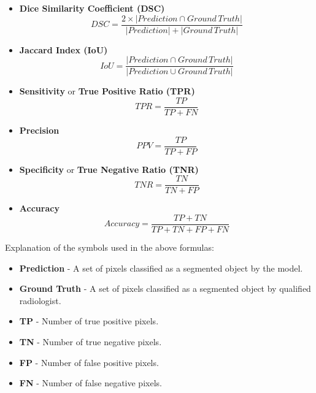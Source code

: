 \begin{itemize}
    \item \textbf{Dice Similarity Coefficient (DSC)} \begin{equation}
    DSC = \frac{2 \times |Prediction \cap Ground\,Truth|}{|Prediction| + |Ground\,Truth|} 
\end{equation}

    \item \textbf{Jaccard Index (IoU)}
    \begin{equation}
     IoU = \frac{|Prediction \cap Ground\,Truth|}{|Prediction \cup Ground\,Truth|} \end{equation}

     \item \textbf{Sensitivity} or \textbf{ True Positive Ratio (TPR)}
    \begin{equation}
     TPR = \frac{TP}{TP + FN}
 \end{equation}

     \item \textbf{Precision} 
    \begin{equation}
      PPV = \frac{TP}{TP + FP} 
 \end{equation}


 \item \textbf{Specificity} or \textbf{ True Negative Ratio (TNR)}
    \begin{equation}
      TNR = \frac{TN}{TN + FP}
 \end{equation}


 \item \textbf{Accuracy} 
    \begin{equation}
      Accuracy = \frac{TP + TN}{TP + TN + FP + FN} 
 \end{equation}
\end{itemize}

Explanation of the symbols used in the above formulas:
\begin{itemize}
    \item \textbf{Prediction} - A set of pixels classified as a segmented object by the model.
    \item \textbf{Ground Truth} - A set of pixels classified as a segmented object by qualified radiologist.
    \item \textbf{TP} - Number of true positive pixels.
    \item \textbf{TN} - Number of true negative pixels.
    \item \textbf{FP} - Number of false positive pixels.
    \item \textbf{FN} - Number of false negative pixels.
    
\end{itemize}

